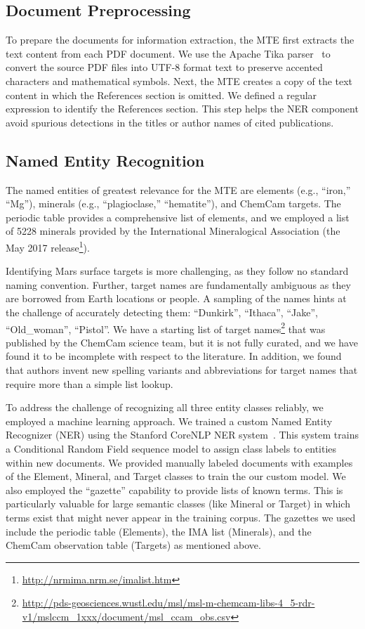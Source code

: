 \documentclass[letterpaper]{article} %
\begin{document}
\subsection{Document Preprocessing}

To prepare the documents for information extraction, the MTE first
extracts the text content from each PDF document.  We use the Apache
Tika parser~\cite{mattmann:tika11} to convert the source PDF files
into UTF-8 format text to preserve accented characters and
mathematical symbols.
Next, the MTE creates a copy of the text content in which the
References section is omitted.  We defined a regular expression to
identify the References section.
This step helps the NER component avoid spurious detections in the
titles or author names of cited publications.

\subsection{Named Entity Recognition}

The named entities of greatest relevance for the MTE are elements
(e.g., ``iron,'' ``Mg''), minerals (e.g., ``plagioclase,''
``hematite''), and ChemCam targets.  The periodic table provides a
comprehensive list of elements, and we employed a list of 5228
minerals provided by the International Mineralogical Association (the
May 2017 release\footnote{\url{http://nrmima.nrm.se/imalist.htm}}). 

Identifying Mars surface targets is more challenging, as they follow
no standard naming convention.  Further, target names are
fundamentally ambiguous as they are borrowed from Earth locations or
people.  A sampling of the names hints at the challenge of accurately
detecting them: ``Dunkirk'', ``Ithaca'', ``Jake'', ``Old\_woman'',
``Pistol''.  We have a starting list of target
names\footnote{\url{http://pds-geosciences.wustl.edu/msl/msl-m-chemcam-libs-4_5-rdr-v1/mslccm_1xxx/document/msl_ccam_obs.csv}}
that was published by the ChemCam science team, but it is not fully
curated, and we have found it to be incomplete with respect to the
literature.
%
In addition, we found that authors invent new spelling
variants and abbreviations for target names that require more than a
simple list lookup.

To address the challenge of recognizing all three entity classes
reliably, we employed a machine learning approach.  We trained a
custom Named Entity Recognizer (NER) using the Stanford CoreNLP NER
system~\cite{finkel:ner05}.  This system trains a Conditional Random
Field sequence model to assign class labels to entities within new
documents.  We provided manually labeled documents with examples of
the Element, Mineral, and Target classes to train the our custom
model.  We also employed the ``gazette'' capability to provide lists
of known terms.  This is particularly valuable for large semantic
classes (like Mineral or Target) in which terms exist that might never
appear in the training corpus.  The gazettes we used include the
periodic table (Elements), the IMA list (Minerals), and the ChemCam
observation table (Targets) as mentioned above.
\end{document}
